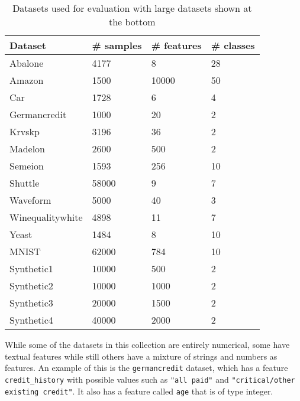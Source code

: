 \documentclass[a4paper,12pt,twoside,openright]{report}
\begin{document}
\begin{table}
\centering


\begin{tabular}{|l|l|l|l|}
\hline
Dataset          & \# samples & \# features & \# classes \\ \hline\hline
Abalone          & 4177       & 8           & 28         \\ \hline
Amazon           & 1500       & 10000       & 50         \\ \hline
Car              & 1728       & 6           & 4          \\ \hline
Germancredit     & 1000       & 20          & 2          \\ \hline
Krvskp           & 3196       & 36          & 2          \\ \hline
Madelon          & 2600       & 500         & 2          \\ \hline
Semeion          & 1593       & 256         & 10         \\ \hline
Shuttle          & 58000      & 9           & 7          \\ \hline
Waveform         & 5000       & 40          & 3          \\ \hline
Winequalitywhite & 4898       & 11          & 7          \\ \hline
Yeast            & 1484       & 8           & 10         \\ \hline\hline
MNIST            & 62000      & 784         & 10         \\ \hline
Synthetic1            & 10000       & 500           & 2         \\ \hline
Synthetic2            & 10000       & 1000           & 2         \\ \hline
Synthetic3            & 20000       & 1500           & 2         \\ \hline
Synthetic4            & 40000       & 2000           & 2         \\ \hline
\end{tabular}

\caption{Datasets used for evaluation with large datasets shown at the bottom}
\label{datasets_info}

\end{table}


While some of the datasets in this collection are entirely numerical, some have textual features while still others have a mixture of strings and numbers as features. An example of this is the \texttt{germancredit} dataset, which has a feature \texttt{credit\_history} with possible values such as \texttt{"all paid"} and \texttt{"critical/other existing credit"}. It also has a feature called \texttt{age} that is of type integer.
\end{document}
